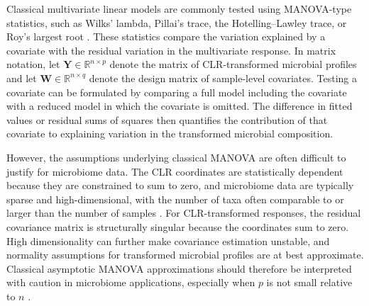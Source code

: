 Classical multivariate linear models are commonly tested using MANOVA-type statistics, such as Wilks' lambda, Pillai's trace, the Hotelling--Lawley trace, or Roy's largest root \citep{rencher2002methods}. These statistics compare the variation explained by a covariate with the residual variation in the multivariate response. In matrix notation, let $\mathbf{Y}\in\mathbb{R}^{n\times p}$ denote the matrix of CLR-transformed microbial profiles and let $\mathbf{W}\in\mathbb{R}^{n\times q}$ denote the design matrix of sample-level covariates. Testing a covariate can be formulated by comparing a full model including the covariate with a reduced model in which the covariate is omitted. The difference in fitted values or residual sums of squares then quantifies the contribution of that covariate to explaining variation in the transformed microbial composition.

However, the assumptions underlying classical MANOVA are often difficult to justify for microbiome data. The CLR coordinates are statistically dependent because they are constrained to sum to zero, and microbiome data are typically sparse and high-dimensional, with the number of taxa often comparable to or larger than the number of samples \citep{aitchison1986statistical,gloor2017microbiome,xia2024applied}. For CLR-transformed responses, the residual covariance matrix is structurally singular because the coordinates sum to zero. High dimensionality can further make covariance estimation unstable, and normality assumptions for transformed microbial profiles are at best approximate. Classical asymptotic MANOVA approximations should therefore be interpreted with caution in microbiome applications, especially when $p$ is not small relative to $n$ \citep{chen2010twosample}.

